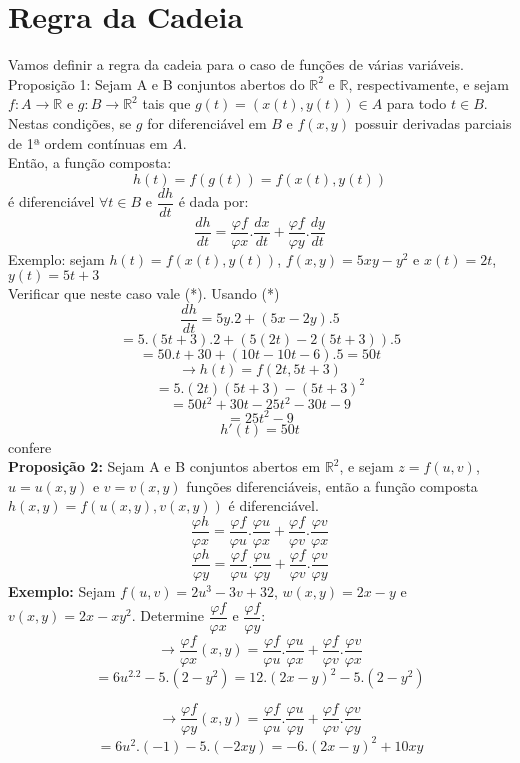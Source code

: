 \documentclass{article}
\begin{document}
	\section{Regra da Cadeia}
		Vamos definir a regra da cadeia para o caso de funções de várias variáveis.\\
		Proposição 1: Sejam A e B conjuntos abertos do $\mathbb{R}^2$ e $\mathbb{R}$, respectivamente, e sejam $f:A \to \mathbb{R}$ e $g:B \to \mathbb{R}^2$ tais que $g(t) = (x(t),y(t)) \in A$ para todo $t \in B$. Nestas condições, se $g$ for diferenciável em $B$ e $f(x,y)$ possuir derivadas parciais de 1ª ordem contínuas em $A$.\\
		Então, a função composta:\\
			$$h(t)= f(g(t))=f(x(t),y(t))$$
		é diferenciável $\forall t \in B$ e $\dfrac{dh}{dt}$ é dada por:
			$$\dfrac{dh}{dt} = \dfrac{\varphi f}{\varphi x}. \dfrac{dx}{dt}+\dfrac{\varphi f}{\varphi y}.\dfrac{dy}{dt}$$
		Exemplo: sejam $h(t)=f(x(t),y(t))$, $f(x,y)=5xy-y^2$ e $x(t) = 2t$, $y(t)=5t+3$\\
		Verificar que neste caso vale (*). Usando (*)\\
		$$\dfrac{dh}{dt} = 5y.2+(5x-2y).5$$
		$$=5.(5t+3).2+(5(2t)-2(5t+3)).5$$
		$$=50.t+30+(10t-10t-6).5 = 50t$$
		$$\to h(t) = f(2t,5t+3)$$
		$$=5.(2t)(5t+3)-(5t+3)^2$$
		$$=50t^2+30t-25t^2-30t-9$$
		$$= 25t^2-9$$
		$$h'(t) = 50t$$
		confere\\
		\textbf{Proposição 2:} Sejam A e B conjuntos abertos em $\mathbb{R}^2$, e sejam $z=f(u,v)$, $u=u(x,y)$ e $v=v(x,y)$ funções diferenciáveis, então a função composta $h(x,y) = f(u(x,y),v(x,y))$ é diferenciável.
		$$\dfrac{\varphi h}{\varphi x} = \dfrac{\varphi f}{\varphi u} . \dfrac{\varphi u}{\varphi x} +\dfrac{\varphi f}{\varphi v}. \dfrac{\varphi v}{\varphi x}$$
		$$\dfrac{\varphi h}{\varphi y} = \dfrac{\varphi f}{\varphi u}.\dfrac{\varphi u}{\varphi y}+\dfrac{\varphi f}{\varphi v}.\dfrac{\varphi v}{\varphi y}$$
		\textbf{Exemplo:} Sejam $f(u,v) =2u^3-3v+3	2$, $w(x,y)=2x-y$ e $v(x,y)=2x - xy^2$. Determine $\dfrac{\varphi f}{\varphi x}$ e $\dfrac{\varphi f}{\varphi y}$:
		$$\to \dfrac{\varphi f}{\varphi x}(x,y)=\dfrac{\varphi f}{\varphi u}.\dfrac{\varphi u}{\varphi x} + \dfrac{\varphi f}{\varphi v}. \dfrac{\varphi v}{\varphi x}$$	
		$$= 6u^2.2-5.(2-y^2)= 12.(2x-y)^2-5.(2-y^2)$$		
		
		$$\to \dfrac{\varphi f}{\varphi y}(x,y)= \dfrac{\varphi f}{\varphi u}.\dfrac{\varphi u}{\varphi y}+ \dfrac{\varphi f}{\varphi v}.\dfrac{\varphi v}{\varphi y}$$
		$$= 6u^2.(-1)-5.(-2xy)= -6.(2x-y)^2+10xy$$
		
\end{document}
